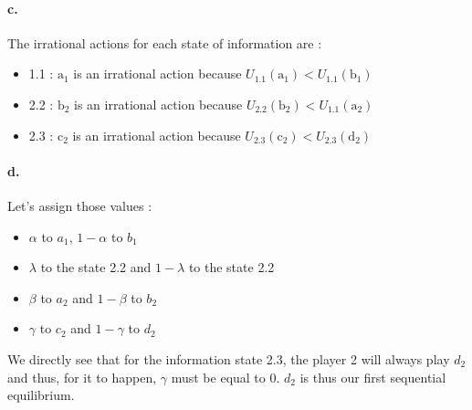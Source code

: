 \paragraph{c.}\label{parac} The irrational actions for each state of information are :

\begin{itemize}
\item 1.1 : $\text{a}_1$ is an irrational action because $U_{1.1} (\text{a}_1) < U_{1.1} (\text{b}_1)$
\item 2.2 : $\text{b}_2$ is an irrational action because $U_{2.2} (\text{b}_2) < U_{1.1} (\text{a}_2)$
\item 2.3 : $\text{c}_2$ is an irrational action because $U_{2.3} (\text{c}_2) < U_{2.3} (\text{d}_2)$
\end{itemize}
\paragraph{d.} Let's assign those values :\begin{itemize}
    \item $\alpha$ to $a_1$, $1-\alpha$ to $b_1$
    \item $\lambda$ to the state 2.2 and $1-\lambda$ to the state 2.2
    \item $\beta$ to $a_2$ and $1-\beta$ to $b_2$
    \item $\gamma$ to $c_2$ and $1-\gamma$ to $d_2$
\end{itemize} 
We directly see that for the information state 2.3, the player 2 will always play $d_2$ and thus, for it to happen, $\gamma$ must be equal to 0. $d_2$ is thus our first sequential equilibrium. \\

